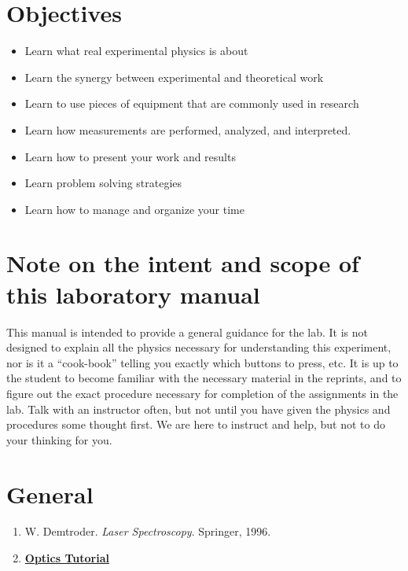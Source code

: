 \documentclass{../lab}
\begin{document}
\section{Objectives}

\begin{itemize}
    \item Learn what real experimental physics is about

    \item Learn the synergy between experimental and theoretical work

    \item Learn to use pieces of equipment that are commonly used in research

    \item Learn how measurements are performed, analyzed, and interpreted.

    \item Learn how to present your work and results

    \item Learn problem solving strategies

    \item Learn how to manage and organize your time

\end{itemize}

\section{Note on the intent and scope of this laboratory manual}

This manual is intended to provide a general guidance for the lab. It is not designed to explain all the physics necessary for understanding this experiment, nor is it a ``cook-book'' telling you exactly which buttons to press, etc. It is up to the student to become familiar with the necessary material in the reprints, and to figure out the exact procedure necessary for completion of the assignments in the lab. Talk with an instructor often, but not until you have given the physics and procedures some thought first. We are here to instruct and help, but not to do your thinking for you.

\section{General}

\begin{enumerate}
    \item W. Demtroder. \emph{Laser Spectroscopy}. Springer, 1996.

    \item \href{http://experimentationlab.berkeley.edu/OpticsTutorial}{\textbf{Optics Tutorial}}

\end{enumerate}
\end{document}
